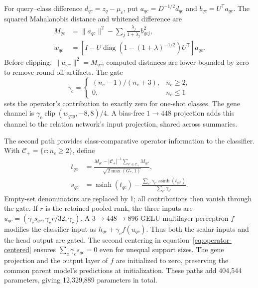 For query--class difference $d_{qc}=z_q-\mu_c$, put $a_{qc}=D^{-1/2}d_{qc}$ and $b_{qc}=U^\mathsf{T}a_{qc}$. The squared Mahalanobis distance and whitened difference are
\begin{align}
 M_{qc}&=\|a_{qc}\|^2-\sum_j\frac{\lambda_j}{1+\lambda_j}b_{qcj}^{2},\label{eq:operator-mahalanobis}\\
 w_{qc}&=\left[I-U\operatorname{diag}\!\left(1-(1+\lambda)^{-1/2}\right)U^\mathsf{T}\right]a_{qc}.
 \label{eq:operator-whitening}
\end{align}
Before clipping, $\|w_{qc}\|^2=M_{qc}$; computed distances are lower-bounded by zero to remove round-off artifacts. The gate
\begin{equation}
 \gamma_c=\begin{cases}(n_c-1)/(n_c+3),&n_c\geq2,\\0,&n_c\leq1\end{cases}
 \label{eq:operator-gate}
\end{equation}
sets the operator's contribution to exactly zero for one-shot classes. The gene channel is $\gamma_c\operatorname{clip}(w_{qcg},-8,8)/4$. A bias-free $1\rightarrow448$ projection adds this channel to the relation network's input projection, shared across summaries.

The second path provides class-comparative operator information to the classifier. With $\mathcal C_+=\{c:n_c\geq2\}$, define
\begin{align}
 t_{qc}&=\frac{M_{qc}-|\mathcal C_+|^{-1}\sum_{c'\in\mathcal C_+}M_{qc'}}{\sqrt{2\max(G_\ast,1)}},\\
 s_{qc}&=\operatorname{asinh}(t_{qc})-
 \frac{\sum_{c'}\gamma_{c'}\operatorname{asinh}(t_{qc'})}{\sum_{c'}\gamma_{c'}}.
 \label{eq:operator-centered}
\end{align}
Empty-set denominators are replaced by 1; all contributions then vanish through the gate. If $r$ is the retained pooled rank, the three inputs are $u_{qc}=(\gamma_cs_{qc},\gamma_cr/32,\gamma_c)$. A $3\rightarrow448\rightarrow896$ GELU multilayer perceptron $f$ modifies the classifier input as $h_{qc}+\gamma_cf(u_{qc})$. Thus both the scalar inputs and the head output are gated. The second centering in equation~\ref{eq:operator-centered} ensures $\sum_c\gamma_cs_{qc}=0$ even for unequal support sizes. The gene projection and the output layer of $f$ are initialized to zero, preserving the common parent model's predictions at initialization. These paths add 404,544 parameters, giving 12,329,889 parameters in total.

